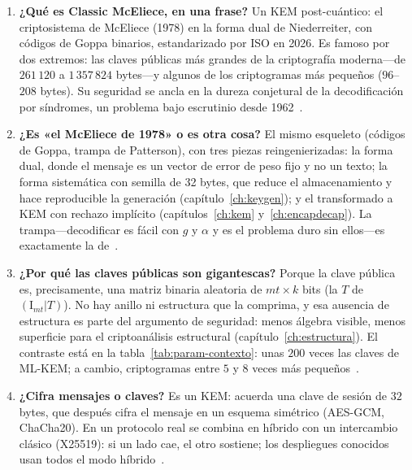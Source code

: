 \begin{enumerate}[leftmargin=1.9em,itemsep=5pt]
  \item \textbf{¿Qué es Classic McEliece, en una frase?} Un KEM
        post-cuántico: el criptosistema de McEliece (1978) en la
        forma dual de Niederreiter, con códigos de Goppa binarios,
        estandarizado por ISO en 2026. Es famoso por dos extremos:
        las claves públicas más grandes de la criptografía
        moderna---de $261\,120$ a $1\,357\,824$ bytes---y algunos de
        los criptogramas más pequeños ($96$--$208$ bytes). Su
        seguridad se ancla en la dureza conjetural de la
        decodificación por síndromes, un problema bajo escrutinio
        desde 1962~\cite{cmspec,cmsecurity}.

  \item \textbf{¿Es «el McEliece de 1978» o es otra cosa?} El mismo
        esqueleto (códigos de Goppa, trampa de Patterson), con tres
        piezas reingenierizadas: la forma dual, donde el mensaje es
        un vector de error de peso fijo y no un texto; la forma
        sistemática con semilla de 32 bytes, que reduce el
        almacenamiento y hace reproducible la generación
        (capítulo~\ref{ch:keygen}); y el transformado a KEM con
        rechazo implícito (capítulos~\ref{ch:kem}
        y~\ref{ch:encapdecap}). La trampa---decodificar es fácil con
        $g$ y $\alpha$ y es el problema duro sin
        ellos---es exactamente la de~\cite{mceliece1978}.

  \item \textbf{¿Por qué las claves públicas son gigantescas?}
        Porque la clave pública es, precisamente, una matriz binaria
        aleatoria de $mt\times k$ bits (la $T$ de
        $(\mathrm{I}_{mt}|T)$). No hay anillo ni estructura que la
        comprima, y esa ausencia de estructura es parte del argumento
        de seguridad: menos álgebra visible, menos superficie para el
        criptoanálisis estructural (capítulo~\ref{ch:estructura}).
        El contraste está en la tabla~\ref{tab:param-contexto}: unas
        $200$ veces las claves de ML-KEM; a cambio, criptogramas
        entre $5$ y $8$ veces más pequeños~\cite{cmsecurity}.

  \item \textbf{¿Cifra mensajes o claves?} Es un KEM: acuerda una
        clave de sesión de $32$ bytes, que después cifra el mensaje
        en un esquema simétrico (AES-GCM, ChaCha20). En un protocolo
        real se combina en híbrido con un intercambio clásico
        (X25519): si un lado cae, el otro sostiene; los despliegues
        conocidos usan todos el modo
        híbrido~\cite{cmimpl,bernstein2026}.


\end{enumerate}
